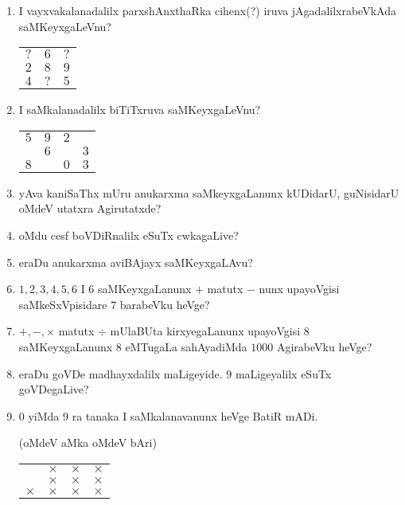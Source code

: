 \begin{enumerate}
\item I vayxvakalanadalilx parxshAnxthaRka cihenx(?) iruva jAgadalilxrabeVkAda saMKeyxgaLeVnu?
\begin{center}
\begin{tabular}{ccc}
$?$ & $6$ & $?$\\
$2$ & $8$ & $9$\\
\hline
$4$ & $?$ & $5$
\end{tabular}
\end{center}

\item I saMkalanadalilx \underline{\qquad} biTiTxruva saMKeyxgaLeVnu?
\begin{center}
\begin{tabular}{cccc}
$5$ & $9$ & $2$ & \underline{\quad}\\
\underline{\quad} & $6$ & \underline{\quad} & $3$\\
\hline
$8$ & \underline{\quad} & $0$ & $3$
\end{tabular}
\end{center}

\item yAva kaniSaThx mUru anukarxma saMkeyxgaLanunx kUDidarU, guNisidarU oMdeV utatxra Agirutatxde?

\item oMdu cesf boVDiRnalilx eSuTx cwkagaLive?

\item eraDu anukarxma aviBAjayx saMKeyxgaLAvu?

\item $1,2,3,4,5,6$ I $6$ saMKeyxgaLanunx $+$ matutx $-$ nunx upayoVgisi saMkeSxVpisidare $7$ barabeVku heVge?

\item $+,-,\times$ matutx $\div$ mUlaBUta kirxyegaLanunx upayoVgisi $8$ saMKeyxgaLanunx $8$ eMTugaLa sahAyadiMda $1000$ AgirabeVku heVge?

\item eraDu goVDe madhayxdalilx maLigeyide. $9$ maLigeyalilx eSuTx goVDegaLive?

\item $0$ yiMda $9$ ra tanaka I saMkalanavanunx heVge BatiR mADi.

(oMdeV aMka oMdeV bAri)
\begin{center}
\begin{tabular}{cccc}
 & $\times$ & $\times$ & $\times$\\
 & $\times$ & $\times$ & $\times$\\
\hline
$\times$ & $\times$ & $\times$ & $\times$\\
\end{tabular}
\end{center}


\end{enumerate}
